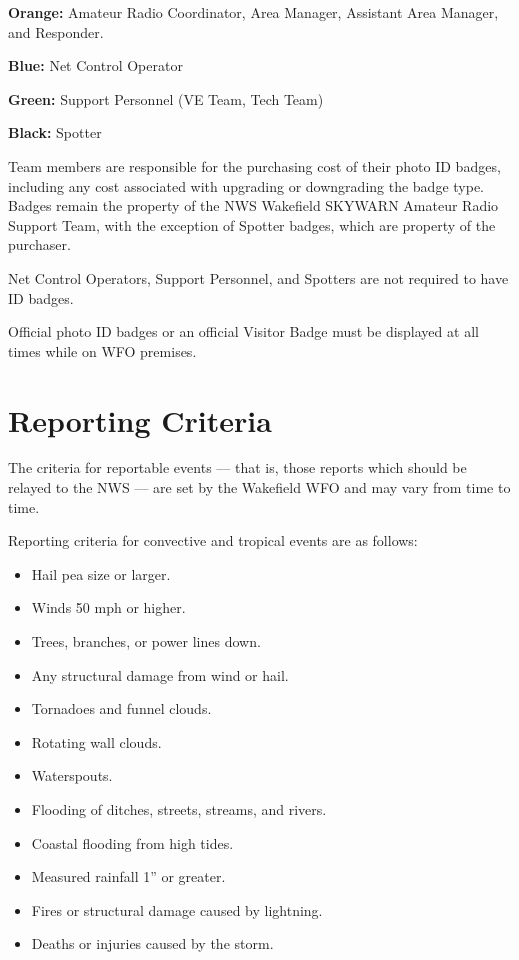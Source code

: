 \documentclass[pdflatex,letterpaper,twoside,12pt]{book}
\begin{document}
\textbf{Orange:}  Amateur Radio Coordinator, Area Manager, Assistant Area Manager, and Responder.

\textbf{Blue:}  Net Control Operator

\textbf{Green:}  Support Personnel (VE Team, Tech Team)

\textbf{Black:}  Spotter

Team members are responsible for the purchasing cost of their photo ID badges, including any cost associated with upgrading or downgrading the badge type.  Badges remain the property of the NWS Wakefield SKYWARN Amateur Radio Support Team, with the exception of Spotter badges, which are property of the purchaser.

Net Control Operators, Support Personnel, and Spotters are not required to have ID badges.

Official photo ID badges or an official Visitor Badge must be displayed at all times while on WFO premises.


\chapter{Reporting Criteria}\label{reporting-criteria}

The criteria for reportable events –-- that is, those reports which should be relayed to the NWS –-- are set by the Wakefield WFO and may vary from time to time.

Reporting criteria for convective and tropical events are as follows:
\begin{itemize}
\item Hail pea size or larger.
\item Winds 50 mph or higher.
\item Trees, branches, or power lines down.
\item Any structural damage from wind or hail.
\item Tornadoes and funnel clouds.
\item Rotating wall clouds.
\item Waterspouts.
\item Flooding of ditches, streets, streams, and rivers.
\item Coastal flooding from high tides.
\item Measured rainfall 1” or greater.
\item Fires or structural damage caused by lightning.
\item Deaths or injuries caused by the storm.
\end{itemize}
\end{document}
